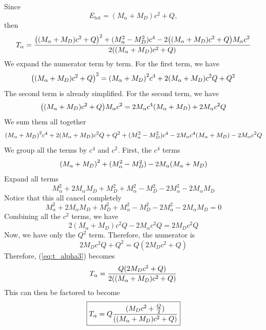 \documentclass[12pt,a4paper]{article}
\begin{document}
\begin{solution_pset}
			Since
			\[
				E_\text{tot} = (M_\alpha + M_D)c^2 +Q,
			\]
			then
			\[
				T_\alpha
				=
				\frac{
					\pqty{
						(M_\alpha + M_D)c^2 +Q
					}^2 
					+ 
					(
						M_\alpha^2 - M_D^2
					)
					c^4
					- 
					2
					\pqty{
						(M_\alpha + M_D)c^2 +Q
					} 
					M_\alpha c^2 
				}{
					2
					\pqty{
						(M_\alpha + M_D)c^2 +Q
					} 
				} 
			\]
			We expand the numerator term by term. For the first term, we have
			\[
				\pqty{
					(M_\alpha + M_D)c^2 +Q
				}^2 
				=
				\pqty{
					M_\alpha + M_D
				}^2
				c^4
				+ 2
				\pqty{
					M_\alpha + M_D
				}
				c^2 
				Q
				+
				Q^2
			\]
			The second term is already simplified. 
			For the second term, we have
			\[
				\pqty{
					(M_\alpha + M_D)c^2 +Q
				} 
				M_\alpha c^2 
				=
				2M_\alpha c^4 
				(M_\alpha + M_D)
				+
				2M_\alpha c^2 
				Q
			\]
			We sum them all together
			\[
				\pqty{
					M_\alpha + M_D
				}^2
				c^4
				+ 2
				\pqty{
					M_\alpha + M_D
				}
				c^2 
				Q
				+
				Q^2
				+ 
				(
					M_\alpha^2 - M_D^2
				)
				c^4
				-
				2M_\alpha c^4 
				(M_\alpha + M_D)
				-
				2M_\alpha c^2 
				Q
			\]
			We group all the terms by $c^4$ and $c^2$. First, the $c^4$ terms
			\[
				\pqty{
					M_\alpha + M_D
				}^2
				+ 
				(
					M_\alpha^2 - M_D^2
				)
				-
				2M_\alpha 
				(M_\alpha + M_D)
			\]
			Expand all terms
			\[
				M_\alpha^2
				+ 2 M_\alpha M_D
				+ M_D^2
				+
				M_\alpha^2 - M_D^2
				-
				2M_\alpha^2
				-
				2M_\alpha M_D
			\]
			Notice that this all cancel completely
			\[
				M_\alpha^2
				+ 2 M_\alpha M_D
				+ M_D^2
				+
				M_\alpha^2 - M_D^2
				-
				2M_\alpha^2
				-
				2M_\alpha M_D
				=
				0
			\]
			Combining all the $c^2$ terms, we have
			\[
				2(M_\alpha + M_D) c^2 Q - 2 M_\alpha c^2 Q
				= 2M_Dc^2 Q
			\]
			Now, we have only the $Q^2$ term. Therefore, the numerator is
			\[
				2M_D c^2 Q + Q^2 
				=
				Q(2M_D c^2+  Q)
			\]
			Therefore, (\ref{eq:t_alpha3}) becomes
			\[
				T_\alpha
				=
				\frac{
					Q(2M_D c^2+  Q)
				}{
					2
					\pqty{
						(M_\alpha + M_D)c^2 +Q
					} 
				} 
			\]
			This can then be factored to become
			\begin{equation}
				\label{eq:t_alpha4}
				\boxed{
					T_\alpha
					=
					Q
					\frac{
						(M_D c^2+\frac{Q}{2})
					}{
						\pqty{
							(M_\alpha + M_D)c^2 +Q
						} 
					} 
				}
			\end{equation}

\end{solution_pset}
\end{document}
